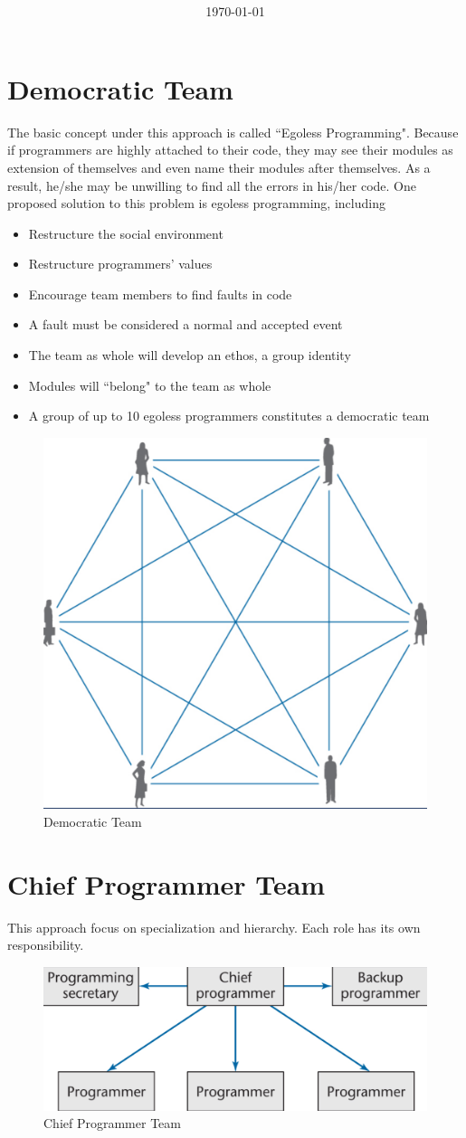 \documentclass[11pt]{article}
\title{\textbf{\Topic}}
\author{\Name}
\date{\today}
\begin{document}
\maketitle
\noindent\makebox[\linewidth]{\rule[8pt]{5in}{0.5pt}}

\section*{Democratic Team}

The basic concept under this approach is called ``Egoless Programming". Because if programmers are highly attached to their code, they may see their modules as extension of themselves and even name their modules after themselves. As a result, he/she may be unwilling to find all the errors in his/her code. One proposed solution to this problem is egoless programming, including

\begin{itemize}
	\item Restructure the social environment
	\item Restructure programmers' values
	\item Encourage team members to find faults in code
	\item A fault must be considered a normal and accepted event
	\item The team as whole will develop an ethos, a group identity
	\item Modules will ``belong" to the team as whole
	\item A group of up to 10 egoless programmers constitutes a democratic team
\end{itemize}

\begin{figure}[h]
	\centering
	\includegraphics[width=0.4\linewidth]{images/DemocraticTeam.png}
	\caption{Democratic Team}
	\label{fig:DemocraticTeam}
\end{figure}


\section*{Chief Programmer Team}

This approach focus on specialization and hierarchy. Each role has its own responsibility.

\begin{figure}[h]
	\centering
	\includegraphics[width=0.9\linewidth]{images/ChiefProgrammerTeam.png}
	\caption{Chief Programmer Team}
	\label{fig:ChiefProgrammerTeam}
\end{figure}
\end{document}
